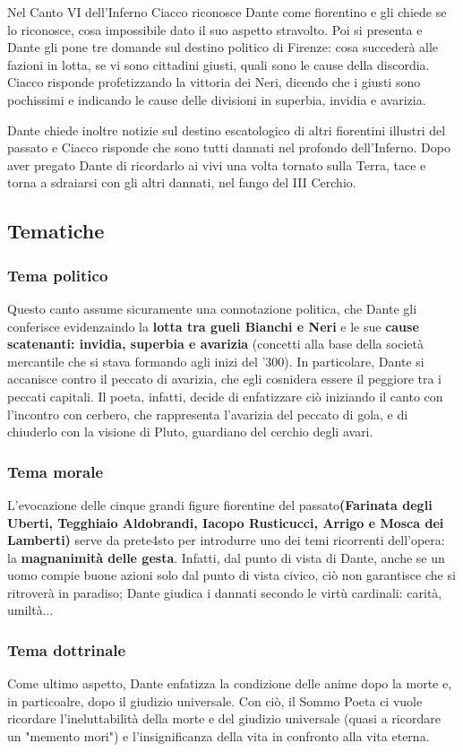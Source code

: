 \documentclass[10pt,a4paper]{article}
\begin{document}
	Nel Canto VI dell'Inferno Ciacco riconosce Dante come fiorentino e gli chiede se lo riconosce, cosa impossibile dato il suo aspetto stravolto. Poi si presenta e Dante gli pone tre domande sul destino politico di Firenze: cosa succederà alle fazioni in lotta, se vi sono cittadini giusti, quali sono le cause della discordia. Ciacco risponde profetizzando la vittoria dei Neri, dicendo che i giusti sono pochissimi e indicando le cause delle divisioni in superbia, invidia e avarizia.
	
	Dante chiede inoltre notizie sul destino escatologico di altri fiorentini illustri del passato e Ciacco risponde che sono tutti dannati nel profondo dell'Inferno. Dopo aver pregato Dante di ricordarlo ai vivi una volta tornato sulla Terra, tace e torna a sdraiarsi con gli altri dannati, nel fango del III Cerchio.
	
	\subsection{Tematiche}
	
	\subsubsection{Tema politico}
	
	Questo canto assume sicuramente una connotazione politica, che Dante gli conferisce evidenzaindo la \textbf{lotta tra gueli Bianchi e Neri} e le sue \textbf{cause scatenanti: invidia, superbia e avarizia} (concetti alla base della società mercantile che si stava formando agli inizi del '300). In particolare, Dante si accanisce contro il peccato di avarizia, che egli cosnidera essere il peggiore tra i peccati capitali. Il poeta, infatti, decide di enfatizzare ciò iniziando il canto con l'incontro con cerbero, che rappresenta l'avarizia del peccato di gola, e di chiuderlo con la visione di Pluto, guardiano del cerchio degli avari.
	
	\subsubsection{Tema morale}
	
	L'evocazione delle cinque grandi figure fiorentine del passato\textbf{(Farinata degli Uberti, Tegghiaio Aldobrandi, Iacopo Rusticucci, Arrigo e Mosca dei Lamberti)} serve da prete4sto per introdurre uno dei temi ricorrenti dell'opera: la \textbf{magnanimità delle gesta}. Infatti, dal punto di vista di Dante, anche se un uomo compie buone azioni solo dal punto di vista civico, ciò non garantisce che si ritroverà in paradiso; Dante giudica i dannati secondo le virtù cardinali: carità, umiltà...
	
	\subsubsection{Tema dottrinale}
	
	Come ultimo aspetto, Dante enfatizza la condizione delle anime dopo la morte e, in particoalre, dopo il giudizio universale. Con ciò, il Sommo Poeta ci vuole ricordare l'ineluttabilità della morte e del giudizio universale (quasi a ricordare un "memento mori") e l'insignificanza della vita in confronto alla vita eterna.
	
\end{document}
